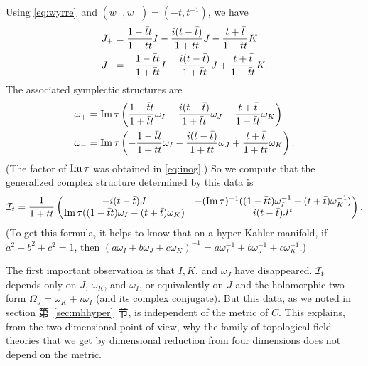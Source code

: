 Using \eqref{eq:wyrre}\ and $(w_+,w_-)=(-t,t^{-1})$, we have %
\setcounter{equation}{27}
\begin{equation}\label{eq:ytro}
\begin{aligned} J_+ & = {1-\bar t t\over 1+\bar t t}I-{i(t-\bar t)\over
1+\bar t t}J-{t+\bar t\over 1+\bar t t}K  \\ J_- & = -{1-\bar
tt\over 1+\bar t t}I-{i(t-\bar t)\over 1+\bar t t}J+{t+\bar t\over
1+\bar t t}K  .\\\end{aligned}
\end{equation}
 The associated symplectic structures are
\setcounter{equation}{28}
\begin{equation}\label{eq:bytro}
\begin{aligned} \omega_+ & ={\rm Im}\,\tau\left( {1-\bar t t\over 1+\bar
t t}\omega_I-{i(t-\bar t)\over 1+\bar t t}\omega_J-{t+\bar t\over
1+\bar t t}\omega_K\right) \\ \omega_- & = {\rm
Im}\,\tau\left(-{1-\bar tt\over 1+\bar t t}\omega_I-{i(t-\bar
t)\over 1+\bar t t}\omega_J+{t+\bar t\over 1+\bar t
t}\omega_K\right) .\\\end{aligned}
\end{equation}
 (The factor of ${\rm Im}\,\tau$ was
obtained in \eqref{eq:inog}.) So we compute that the generalized complex
structure determined by this data is %
\setcounter{equation}{29}
\begin{equation}\label{eq:islo}
{\cal I}_t={1\over
1+\bar t t}\left(\begin{matrix}-i(t-\bar t)J & -({\rm
Im}\,\tau)^{-1}((1-\bar t t)\omega_I^{-1}-(t+\bar
t)\omega_K^{-1})\\ {\rm Im}\,\tau ((1-\bar t t)\omega_I-(t+\bar
t)\omega_K)& i(t-\bar t)J^t\\\end{matrix}\right).
\end{equation}
 (To get this formula, it
helps to know that on a hyper-Kahler manifold, if $a^2+b^2+c^2=1$,
then
$(a\omega_I+b\omega_J+c\omega_K)^{-1}=a\omega_I^{-1}+b\omega_J^{-1}+c\omega_K^{-1}$.)

The first important observation is that $I, K$, and $\omega_J$
have disappeared.  ${\cal I}_t$ depends only on $J$, $\omega_K$,
and $\omega_I$, or equivalently on $J$ and the holomorphic
two-form $\Omega_J=\omega_K+i\omega_I$ (and its complex
conjugate). But this data, as we noted in section 第~\ref{sec:mhhyper}~节, is
independent of the metric of $C$. This explains, from the
two-dimensional point of view, why the family of topological field
theories that we get by dimensional reduction from four dimensions
does not depend on the metric.

